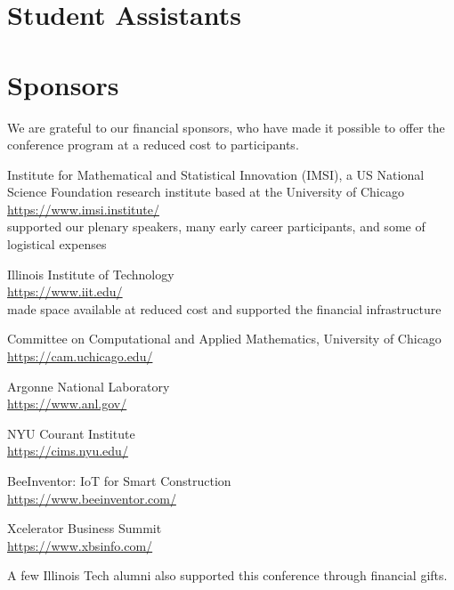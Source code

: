 \section{Student Assistants}


\section{Sponsors}

We are grateful to our financial sponsors, who have made it possible to offer the conference program at a reduced cost to participants.

Institute for Mathematical and Statistical Innovation (IMSI), a US National Science Foundation research institute based at the University of Chicago\\
\url{https://www.imsi.institute/} \\
supported our plenary speakers, many early career participants, and some of logistical expenses

Illinois Institute of Technology\\
\url{https://www.iit.edu/} \\
made space available at reduced cost and supported the financial infrastructure

Committee on Computational and Applied Mathematics, University of Chicago\\
\url{https://cam.uchicago.edu/}

Argonne National Laboratory\\
\url{https://www.anl.gov/}

NYU Courant Institute\\
\url{https://cims.nyu.edu/}

BeeInventor: IoT for Smart Construction\\
\url{https://www.beeinventor.com/}

Xcelerator Business Summit\\
\url{https://www.xbsinfo.com/}

A few Illinois Tech alumni also supported this conference through financial gifts.

\clearpage
{}

